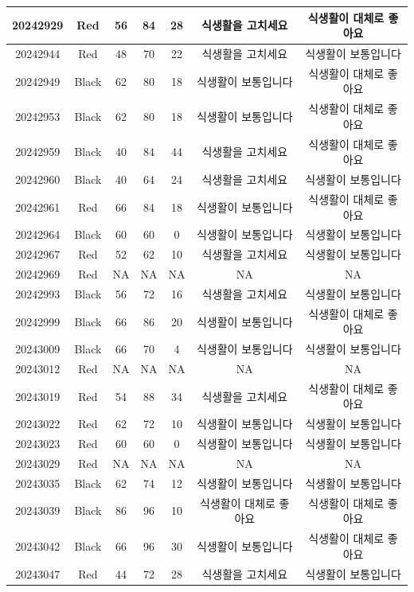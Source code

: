 \documentclass[
]{book}
\begin{document}
\begin{tabular}{c|c|c|c|c|c|c}
\hline
20242929 & Red & 56 & 84 & 28 & 식생활을 고치세요 & 식생활이 대체로 좋아요\\
\hline
20242944 & Red & 48 & 70 & 22 & 식생활을 고치세요 & 식생활이 보통입니다\\
\hline
20242949 & Black & 62 & 80 & 18 & 식생활이 보통입니다 & 식생활이 대체로 좋아요\\
\hline
20242953 & Black & 62 & 80 & 18 & 식생활이 보통입니다 & 식생활이 대체로 좋아요\\
\hline
20242959 & Black & 40 & 84 & 44 & 식생활을 고치세요 & 식생활이 대체로 좋아요\\
\hline
20242960 & Black & 40 & 64 & 24 & 식생활을 고치세요 & 식생활이 보통입니다\\
\hline
20242961 & Red & 66 & 84 & 18 & 식생활이 보통입니다 & 식생활이 대체로 좋아요\\
\hline
20242964 & Black & 60 & 60 & 0 & 식생활이 보통입니다 & 식생활이 보통입니다\\
\hline
20242967 & Red & 52 & 62 & 10 & 식생활을 고치세요 & 식생활이 보통입니다\\
\hline
20242969 & Red & NA & NA & NA & NA & NA\\
\hline
20242993 & Black & 56 & 72 & 16 & 식생활을 고치세요 & 식생활이 보통입니다\\
\hline
20242999 & Black & 66 & 86 & 20 & 식생활이 보통입니다 & 식생활이 대체로 좋아요\\
\hline
20243009 & Black & 66 & 70 & 4 & 식생활이 보통입니다 & 식생활이 보통입니다\\
\hline
20243012 & Red & NA & NA & NA & NA & NA\\
\hline
20243019 & Red & 54 & 88 & 34 & 식생활을 고치세요 & 식생활이 대체로 좋아요\\
\hline
20243022 & Red & 62 & 72 & 10 & 식생활이 보통입니다 & 식생활이 보통입니다\\
\hline
20243023 & Red & 60 & 60 & 0 & 식생활이 보통입니다 & 식생활이 보통입니다\\
\hline
20243029 & Red & NA & NA & NA & NA & NA\\
\hline
20243035 & Black & 62 & 74 & 12 & 식생활이 보통입니다 & 식생활이 보통입니다\\
\hline
20243039 & Black & 86 & 96 & 10 & 식생활이 대체로 좋아요 & 식생활이 대체로 좋아요\\
\hline
20243042 & Black & 66 & 96 & 30 & 식생활이 보통입니다 & 식생활이 대체로 좋아요\\
\hline
20243047 & Red & 44 & 72 & 28 & 식생활을 고치세요 & 식생활이 보통입니다\\

\end{tabular}
\end{document}
